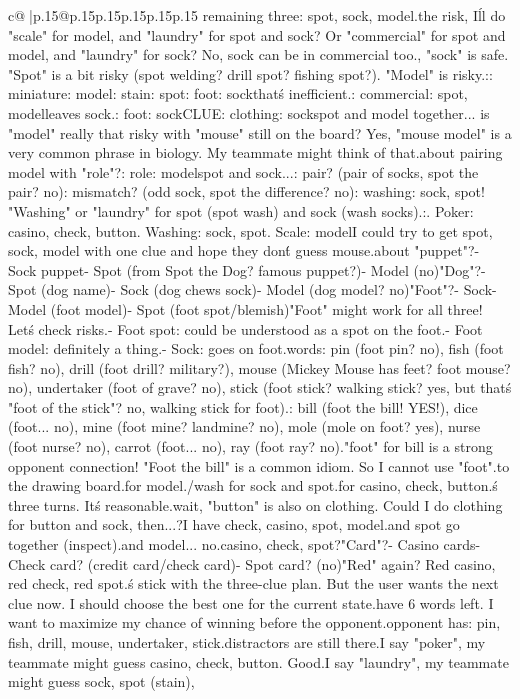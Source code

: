 \documentclass{article}
\begin{document}
{\begin{supertabular}{c@{$\;$}|p{.15\linewidth}@{}p{.15\linewidth}p{.15\linewidth}p{.15\linewidth}p{.15\linewidth}p{.15\linewidth}}
{{{remaining three: spot, sock, model.\n\nGiven the risk, I\'ll do "scale" for model, and "laundry" for spot and sock? Or "commercial" for spot and model, and "laundry" for sock? No, sock can be in commercial too.\n\nActually, "sock" is safe. "Spot" is a bit risky (spot welding? drill spot? fishing spot?). "Model" is risky.\n\nMaybe:\nCLUE: miniature\nTARGETS: model\n\nCLUE: stain\nTARGETS: spot\n\nCLUE: foot\nTARGETS: sock\n\nBut that\'s inefficient.\n\nCLUE: commercial\nTARGETS: spot, model\n\nThis leaves sock.\nCLUE: foot\nTARGETS: sock\n\nOr CLUE: clothing\nTARGETS: sock\n\nBut spot and model together... is "model" really that risky with "mouse" still on the board? Yes, "mouse model" is a very common phrase in biology. My teammate might think of that.\n\nWhat about pairing model with "role"?\nCLUE: role\nTARGETS: model\n\nThen spot and sock...\nCLUE: pair? (pair of socks, spot the pair? no)\nCLUE: mismatch? (odd sock, spot the difference? no)\n\nCLUE: washing\nTARGETS: sock, spot\n\nYes! "Washing" or "laundry" for spot (spot wash) and sock (wash socks).\n\nSo:. Poker: casino, check, button. Washing: sock, spot. Scale: model\n\nOr I could try to get spot, sock, model with one clue and hope they don\'t guess mouse.\nWhat about "puppet"?\n- Sock puppet\n- Spot (from Spot the Dog? famous puppet?)\n- Model (no)\n\n"Dog"?\n- Spot (dog name)\n- Sock (dog chews sock)\n- Model (dog model? no)\n\n"Foot"?\n- Sock\n- Model (foot model)\n- Spot (foot spot/blemish)\n\n"Foot" might work for all three! Let\'s check risks.\n- Foot spot: could be understood as a spot on the foot.\n- Foot model: definitely a thing.\n- Sock: goes on foot.\n\nOpponent words: pin (foot pin? no), fish (foot fish? no), drill (foot drill? military?), mouse (Mickey Mouse has feet? foot mouse? no), undertaker (foot of grave? no), stick (foot stick? walking stick? yes, but that\'s "foot of the stick"? no, walking stick for foot).\n\nDistractors: bill (foot the bill! YES!), dice (foot... no), mine (foot mine? landmine? no), mole (mole on foot? yes), nurse (foot nurse? no), carrot (foot... no), ray (foot ray? no).\n\nSo "foot" for bill is a strong opponent connection! "Foot the bill" is a common idiom. So I cannot use "foot".\n\nBack to the drawing board.\n\nScale for model.\nLaundry/wash for sock and spot.\nPoker for casino, check, button.\n\nThat\'s three turns. It\'s reasonable.\n\nBut wait, "button" is also on clothing. Could I do clothing for button and sock, then...?\nThen I have check, casino, spot, model.\nCheck and spot go together (inspect).\nCasino and model... no.\n\nOr casino, check, spot?\n"Card"?\n- Casino cards\n- Check card? (credit card/check card)\n- Spot card? (no)\n\n"Red" again? Red casino, red check, red spot.\n\nLet\'s stick with the three-clue plan. But the user wants the next clue now. I should choose the best one for the current state.\n\nI have 6 words left. I want to maximize my chance of winning before the opponent.\n\nThe opponent has: pin, fish, drill, mouse, undertaker, stick.\nThe distractors are still there.\n\nIf I say "poker", my teammate might guess casino, check, button. Good.\nIf I say "laundry", my teammate might guess sock, spot (stain), }}}
\end{supertabular}}
\end{document}
